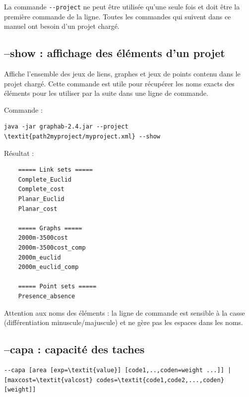 \documentclass[a4paper,10pt]{report}
\begin{document}
La commande \verb|--project| ne peut être utilisée qu'une seule fois et doit être la première commande de la ligne.
Toutes les commandes qui suivent dans ce manuel ont besoin d'un projet chargé.

\subsection{--show : affichage des éléments d'un projet}
Affiche l'ensemble des jeux de liens, graphes et jeux de points contenu dans le projet chargé.
Cette commande est utile pour récupérer les noms exacts des éléments pour les utiliser par la suite dans une ligne de commande.

Commande :
\begin{Verbatim}[commandchars=\\\{\}]
	java -jar graphab-2.4.jar --project \textit{path2myproject/myproject.xml} --show
\end{Verbatim}
Résultat :
\begin{Verbatim}
	===== Link sets =====
	Complete_Euclid
	Complete_cost
	Planar_Euclid
	Planar_cost
	
	===== Graphs =====
	2000m-3500cost
	2000m-3500cost_comp
	2000m_euclid
	2000m_euclid_comp
	
	===== Point sets =====
	Presence_absence
\end{Verbatim}
Attention aux noms des éléments : la ligne de commande est sensible à la casse (différentiation minuscule/majuscule) et ne gère pas les espaces dans les noms.

\subsection{--capa : capacité des taches}
\begin{Verbatim}[commandchars=\\\{\}]
--capa [area [exp=\textit{value}] [code1,..,coden=weight ...]] | [maxcost=\textit{valcost} codes=\textit{code1,code2,...,coden} [weight]]
\end{Verbatim}
\end{document}
